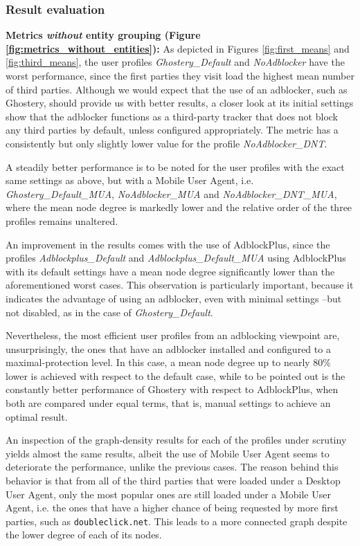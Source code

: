 \documentclass{sig-alternate}
\begin{document}
\subsubsection{Result evaluation}

\textbf{Metrics \textit{without} entity grouping (Figure \ref{fig:metrics_without_entities}):} As depicted in Figures \ref{fig:first_means} and \ref{fig:third_means}, the user profiles \textit{Ghostery\_Default} and \textit{NoAdblocker} have the worst performance, since the first parties they visit load the highest mean number of third parties. Although we would expect that the use of an adblocker, such as Ghostery, should provide us with better results, a closer look at its initial settings show that the adblocker functions as a third-party tracker that does not block any third parties by default, unless configured appropriately. The metric has a consistently but only slightly lower value for the profile \textit{NoAdblocker\_DNT}.

A steadily better performance is to be noted for the user profiles with the exact same settings as above, but with a Mobile User Agent, i.e. \textit{Ghostery\_Default\_MUA}, \textit{NoAdblocker\_MUA} and \textit{NoAdblocker\_DNT\_MUA}, where the mean node degree is markedly lower and the relative order of the three profiles remains unaltered.

An improvement in the results comes with the use of AdblockPlus, since the profiles \textit{Adblockplus\_Default} and \textit{Adblockplus\_Default\_MUA} using AdblockPlus with its default settings have a mean node degree significantly lower than the aforementioned worst cases. This observation is particularly important, because it indicates the advantage of using an adblocker, even with minimal settings --but not disabled, as in the case of \textit{Ghostery\_Default}.

Nevertheless, the most efficient user profiles from an adblocking viewpoint are, unsurprisingly, the ones that have an adblocker installed and configured to a maximal-protection level. In this case, a mean node degree up to nearly 80\% lower is achieved with respect to the default case, while to be pointed out is the constantly better performance of Ghostery with respect to AdblockPlus, when both are compared under equal terms, that is, manual settings to achieve an optimal result.

An inspection of the graph-density results for each of the profiles under scrutiny yields almost the same results, albeit the use of Mobile User Agent seems to deteriorate the performance, unlike the previous cases. The reason behind this behavior is that from all of the third parties that were loaded under a Desktop User Agent, only the most popular ones are still loaded under a Mobile User Agent, i.e. the ones that have a higher chance of being requested by more first parties, such as \texttt{doubleclick.net}. This leads to a more connected graph despite the lower degree of each of its nodes.
\end{document}
